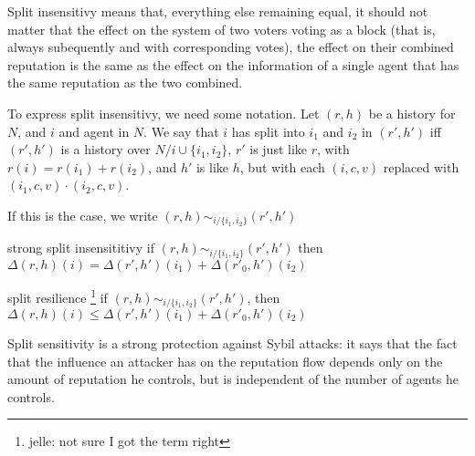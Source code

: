 \documentclass{article}
\begin{document}
Split insensitivy means that, everything else remaining equal, it should not matter that the effect on the system of two voters voting as a block (that is, always subequently and with corresponding votes), the effect on their combined reputation is the same as the effect on the information of a single agent that has the same reputation as the two combined.


To express split insensitivy, we need some notation. Let $(r, h)$ be a history for $N$, and $i$ and agent in $N$. We say that $i$ has split into $i_1$ and $i_2$ in $(r', h')$  iff $(r', h')$ is a history over $N / {i} \cup \{i_1, i_2\}$, $r'$ is just like $r$, with $r(i) = r(i_1) + r(i_2)$, and $h'$ is like $h$, but with each $(i, c, v)$ replaced with $(i_1, c, v) \cdot (i_2, c, v)$. 

If this is the case, we write $(r, h) \sim_{i/\{i_1, i_2\}} (r', h')$

\begin{condition}{strong split insensititivy} 
if $(r, h) \sim_{i/\{i_1, i_2\}} (r', h')$ then $\Delta(r, h)(i) = \Delta(r', h')(i_1) + \Delta(r'_0, h')(i_2)$
\end{condition}


\begin{condition}{split resilience
\footnote{jelle: not sure I got the term right} 
}
if $(r, h) \sim_{i/\{i_1, i_2\}} (r', h')$, then $\Delta(r, h)(i) \leq \Delta(r', h')(i_1) + \Delta(r'_0, h')(i_2)$
\end{condition}



%

Split sensitivity is a strong protection against Sybil attacks: it says that the fact that the influence an attacker has on the reputation flow depends only on the amount of reputation he controls, but is independent of the number of agents he controls.

\end{document}
